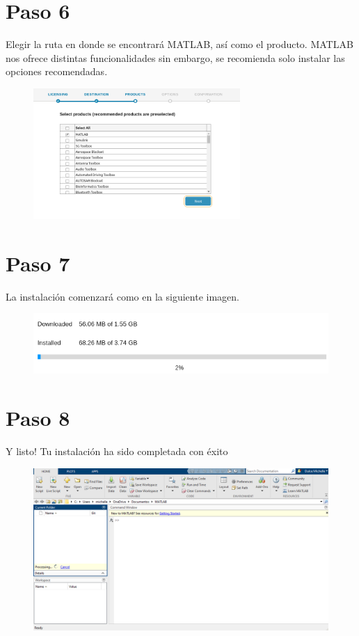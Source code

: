 \documentclass{article}
\begin{document}
\section*{Paso 6}
Elegir la ruta en donde se encontrará MATLAB, así como el producto. MATLAB nos ofrece distintas funcionalidades sin embargo, se recomienda solo instalar las opciones recomendadas. 
\begin{figure}[ht]
\centering
\includegraphics[width=0.7\textwidth]{six.png}
\end{figure}
\section*{Paso 7}

La instalación comenzará como en la siguiente imagen.

\begin{figure}[ht]
\centering
\includegraphics[width=1\textwidth]{ocho.png}
\end{figure}
\section*{Paso 8}
Y listo! Tu instalación ha sido completada con éxito
\begin{figure}[ht]
\centering
\includegraphics[width=1\textwidth]{nueve.png}
\end{figure}
\end{document}
